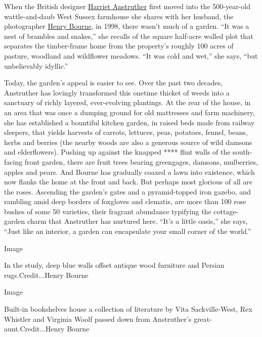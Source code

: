 When the British designer
\href{http://www.harrietanstruther.com/}{Harriet Anstruther} first moved
into the 500-year-old wattle-and-daub West Sussex farmhouse she shares
with her husband, the photographer
\href{http://www.henrybourne.com/}{Henry Bourne}, in 1998, there wasn't
much of a garden. ``It was a nest of brambles and snakes,'' she recalls
of the square half-acre walled plot that separates the timber-frame home
from the property's roughly 100 acres of pasture, woodland and
wildflower meadows. ``It was cold and wet,'' she says, ``but
unbelievably idyllic.''

Today, the garden's appeal is easier to see. Over the past two decades,
Anstruther has lovingly transformed this onetime thicket of weeds into a
sanctuary of richly layered, ever-evolving plantings. At the rear of the
house, in an area that was once a dumping ground for old mattresses and
farm machinery, she has established a bountiful kitchen garden, in
raised beds made from railway sleepers, that yields harvests of carrots,
lettuces, peas, potatoes, fennel, beans, herbs and berries (the nearby
woods are also a generous source of wild damsons and elderflowers).
Pushing up against the knapped **** flint walls of the south-facing
front garden, there are fruit trees bearing greengages, damsons,
mulberries, apples and pears. And Bourne has gradually coaxed a lawn
into existence, which now flanks the home at the front and back. But
perhaps most glorious of all are the roses. Ascending the garden's gates
and a pyramid-topped iron gazebo, and rambling amid deep borders of
foxgloves and clematis, are more than 100 rose bushes of some 50
varieties, their fragrant abundance typifying the cottage-garden charm
that Anstruther has nurtured here. ``It's a little oasis,'' she says,
``Just like an interior, a garden can encapsulate your small corner of
the world.''

Image

In the study, deep blue walls offset antique wood furniture and Persian
rugs.Credit...Henry Bourne

Image

Built-in bookshelves house a collection of literature by Vita
Sackville-West, Rex Whistler and Virginia Woolf passed down from
Anstruther's great-aunt.Credit...Henry Bourne

